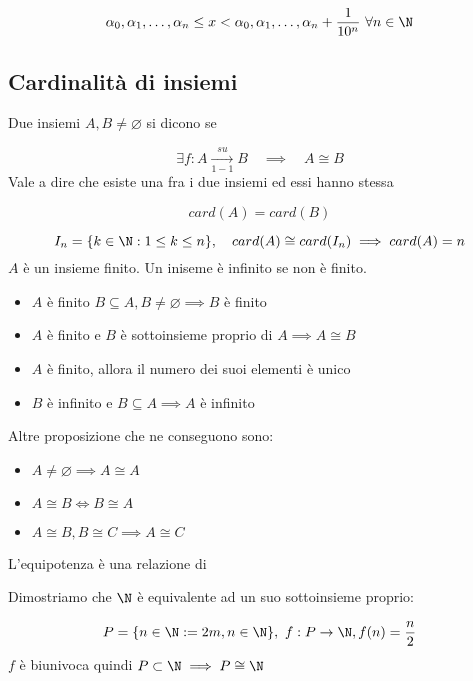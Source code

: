 \documentclass[../appunti.tex]{subfiles}
\begin{document}
\begin{equation}
	\alpha_0, \alpha_1, \dots, \alpha_n \leq x < 
	\alpha_0, \alpha_1, \dots, \alpha_n + \frac{1}{10^n}\ \forall n \in \N
\end{equation}

\subsection{Cardinalità di insiemi}
Due insiemi $ A, B \neq \varnothing $ si dicono  se 

\begin{equation}
	\exists f: A \underset{1 - 1}{\overset{su}{\to}} B \quad
	\implies \quad A \cong B
\end{equation}
Vale a dire che esiste una  fra i due insiemi ed essi hanno stessa

\begin{equation}
	card(A)=card(B)
\end{equation}
\bda

\begin{equation}
	I_n = \{ k \in \N : 1 \leq k \leq n \}, \quad card(A) \cong card(I_n)
	\implies card(A) = n
\end{equation}
$A$ è un insieme finito. Un iniseme è infinito se non è finito. 

\begin{itemize}
	\item $A$ è finito $ B \subseteq A, B \neq \varnothing \implies B$ è finito
	\item $A$ è finito e $B$ è sottoinsieme proprio di $A \implies A \cong B$
	\item $A$ è finito, allora il numero dei suoi elementi è unico
	\item $B$ è infinito e $ B \subseteq A \implies A$ è infinito
\end{itemize}
Altre proposizione che ne conseguono sono:

\begin{itemize} 
	\item $A \neq \varnothing \implies A \cong A$
	\item $A \cong B \iff B \cong A$
	\item $ A \cong B, B \cong C \implies A \cong C$
\end{itemize}
L'equipotenza è una relazione di 

\begin{defn}[ $ \N $ è infinito]
Dimostriamo che $ \N $ è equivalente ad un suo sottoinsieme proprio: 

\begin{equation} 
	P = \{ n \in \N : = 2m, n \in \N \}, \
	f: P \to \N, f(n) = \frac{n}{2}
\end{equation}
$f$ è biunivoca quindi $ P \subset \N \implies P \cong \N $ 
\end{defn}
\end{document}
